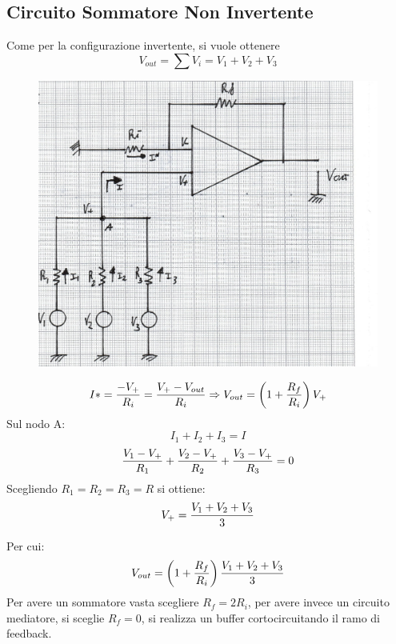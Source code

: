 \documentclass[a4paper, 15pt]{article}
\begin{document}
\subsection{Circuito Sommatore Non Invertente}
\begin{adjustwidth}{2in}{}    		
   		Come per la configurazione invertente, si vuole ottenere \[V_{out} = \sum V_i = V_1 + V_2 + V_3\]   		
   		\begin{figure}[H]
   			\centering
   			\includegraphics[width=0.5\linewidth]{immagini/mm(17)}
   			\label{fig:mm17}
   		\end{figure}   		
   		\[I* = {-V_+\over R_i} = {V_+-V_{out}\over R_i} \Rightarrow V_{out} = \left(1 + {R_f\over R_i}\right)V_+\]
   		Sul nodo A:   		
   			\[I_1 + I_2 + I_3 = I\]    			
   			\[{V_1-V_+\over R_1} + {V_2-V_+\over R_2} + {V_3 - V_+\over R_3} = 0\]   		
   		Scegliendo $R_1 = R_2 = R_3 = R$ si ottiene: 
   		\[V_+ = {V_1+V_2+V_3\over3}\]
   		
   		Per cui:
   		\[V_{out} = \left(1 + {R_f\over R_i}\right){V_1+V_2+V_3\over3} \] 
   		Per avere un sommatore vasta scegliere $R_f = 2R_i$, per avere invece un circuito mediatore, si sceglie $R_f = 0$, si realizza un buffer cortocircuitando il ramo di feedback.  
\end{adjustwidth}
\newpage
\end{document}

